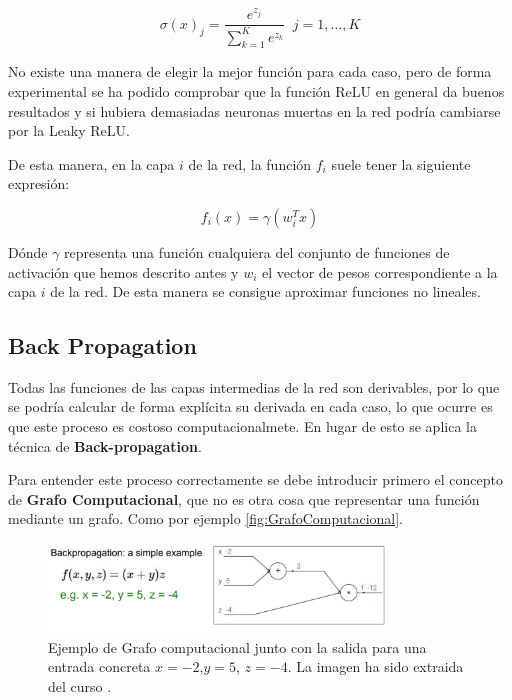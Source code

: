 \begin{itemize}
            \begin{equation}
                \sigma(x)_j= \frac{e^{z_j}}{\sum_{k=1}^{K}e^{z_k}} \; \; j=1, \ldots, K
            \end{equation}
        \end{itemize}

        \noindent No existe una manera de elegir la mejor función para cada caso, pero de forma experimental se ha podido comprobar que la función ReLU en general da buenos resultados y si hubiera demasiadas neuronas muertas en la red podría cambiarse por la Leaky ReLU.

        \medskip

        \noindent De esta manera, en la capa $i$ de la red, la función $f_i$ suele tener la siguiente expresión: 

        \begin{equation}
            f_i(x)=\gamma(w_i^T x)
        \end{equation}

        \noindent Dónde $\gamma$ representa una función cualquiera del conjunto de funciones de activación que hemos descrito antes y $w_i$ el vector de pesos correspondiente a la capa $i$ de la red. De esta manera se consigue aproximar funciones no lineales.
    
    \subsection{Back Propagation}
        Todas las funciones de las capas intermedias de la red son derivables, por lo que se podría calcular de forma explícita su derivada en cada caso, lo que ocurre es que este proceso es costoso computacionalmete. En lugar de esto se aplica la técnica de \textbf{Back-propagation}.

        \medskip

        \noindent Para entender este proceso correctamente se debe introducir primero el concepto de \textbf{Grafo Computacional}, que no es otra cosa que representar una función mediante un grafo. Como por ejemplo \autoref{fig:GrafoComputacional}.

        \begin{figure}[!h]
            \centering
            \includegraphics[width=0.8\textwidth]{img/GrafoComputacional.png}
            \caption{Ejemplo de Grafo computacional junto con la salida para una entrada concreta $x=-2$,$y=5$, $z=-4$. La imagen ha sido extraida del curso \cite{StanfordCourse}.}
            \label{fig:GrafoComputacional}
        \end{figure}


